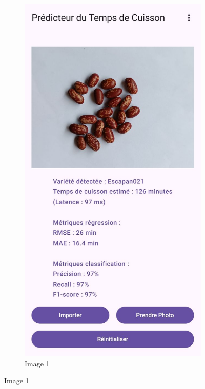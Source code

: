 \begin{figure}[H]
    \begin{subfigure}{0.24\textwidth}
        \centering
        \includegraphics[width=\linewidth]{figures/test1.jpg}
        \caption{Image 1}
    \end{subfigure}\hfill

\end{figure}
